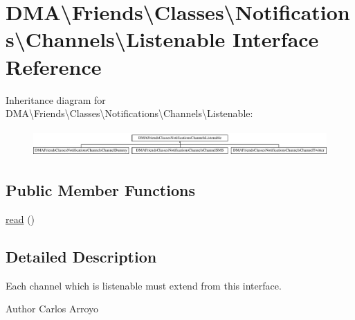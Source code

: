 \hypertarget{interfaceDMA_1_1Friends_1_1Classes_1_1Notifications_1_1Channels_1_1Listenable}{\section{D\-M\-A\textbackslash{}Friends\textbackslash{}Classes\textbackslash{}Notifications\textbackslash{}Channels\textbackslash{}Listenable Interface Reference}
\label{interfaceDMA_1_1Friends_1_1Classes_1_1Notifications_1_1Channels_1_1Listenable}
}
Inheritance diagram for D\-M\-A\textbackslash{}Friends\textbackslash{}Classes\textbackslash{}Notifications\textbackslash{}Channels\textbackslash{}Listenable\-:\begin{figure}[H]
\begin{center}
\leavevmode
\includegraphics[height=1.020036cm]{d7/d72/interfaceDMA_1_1Friends_1_1Classes_1_1Notifications_1_1Channels_1_1Listenable}
\end{center}
\end{figure}
\subsection*{Public Member Functions}
\begin{DoxyCompactItemize}
\item 
\hyperlink{interfaceDMA_1_1Friends_1_1Classes_1_1Notifications_1_1Channels_1_1Listenable_aebc4dc5c57897e075a719e911a590d6e}{read} ()
\end{DoxyCompactItemize}


\subsection{Detailed Description}
Each channel which is listenable must extend from this interface. \begin{DoxyAuthor}{Author}
Carlos Arroyo 
\end{DoxyAuthor}


